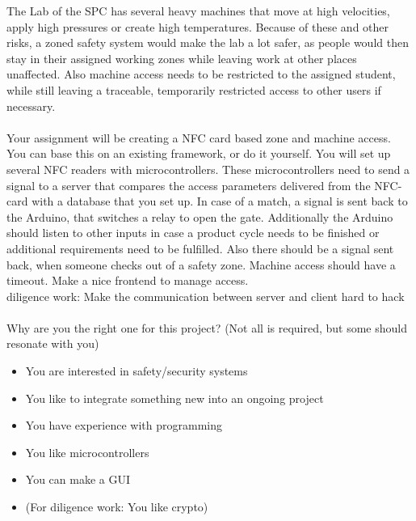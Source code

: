 The Lab of the \ac{SPC} has several heavy machines that move at high velocities, apply high pressures or create high temperatures. Because of these and other risks, a zoned safety system would make the lab a lot safer, as people would then stay in their assigned working zones while leaving work at other places unaffected. Also machine access needs to be restricted to the assigned student, while still leaving a traceable, temporarily restricted access to other users if necessary.\\
\\
Your assignment will be creating a \ac{NFC} card based zone and machine access. You can base this on an existing framework, or do it yourself. You will set up several \ac{NFC} readers with microcontrollers. These microcontrollers need to send a signal to a server that compares the access parameters delivered from the \ac{NFC}-card with a database that you set up. In case of a match, a signal is sent back to the Arduino, that switches a relay to open the gate. Additionally the Arduino should listen to other inputs in case a product cycle needs to be finished or additional requirements need to be fulfilled. Also there should be a signal sent back, when someone checks out of a safety zone. Machine access should have a timeout. Make a nice frontend to manage access.\\
diligence work: Make the communication between server and client hard to hack\\
\\
Why are you the right one for this project? (Not all is required, but some should resonate with you)
\begin{itemize}
\item You are interested in safety/security systems
\item You like to integrate something new into an ongoing project
\item You have experience with programming
\item You like microcontrollers
\item You can make a \ac{GUI}
\item (For diligence work: You like crypto)
\end{itemize}
\bigskip
%

